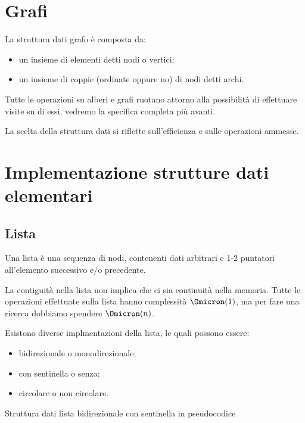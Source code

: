\section{Grafi}

La struttura dati grafo è composta da:
\begin{itemize}
	\item un insieme di elementi detti nodi o vertici;
	\item un insieme di coppie (ordinate oppure no) di nodi detti archi.
\end{itemize}

Tutte le operazioni su alberi e grafi ruotano attorno alla possibilità di effettuare visite su di essi, vedremo la specifica completa più avanti.

\begin{note}
La scelta della struttura dati si riflette sull'efficienza e sulle operazioni ammesse.
\end{note}

\clearpage
\section{Implementazione strutture dati elementari}

\subsection{Lista}

Una lista è una sequenza di nodi, contenenti dati arbitrari e 1-2 puntatori all'elemento successivo e/o precedente.

La contiguità nella lista non implica che ci sia continuità nella memoria.
Tutte le operazioni effettuate sulla lista hanno complessità \(\Omicron(1)\), ma per fare una ricerca dobbiamo spendere \(\Omicron(n)\).

Esistono diverse implmentazioni della lista, le quali possono essere:
\begin{itemize}
	\item bidirezionale o monodirezionale;
	\item con sentinella o senza;
	\item circolare o non circolare.
\end{itemize}


\begin{algorithm}[H]
	\caption{Struttura dati lista bidirezionale con sentinella in pseudocodice}
	
\end{algorithm}


